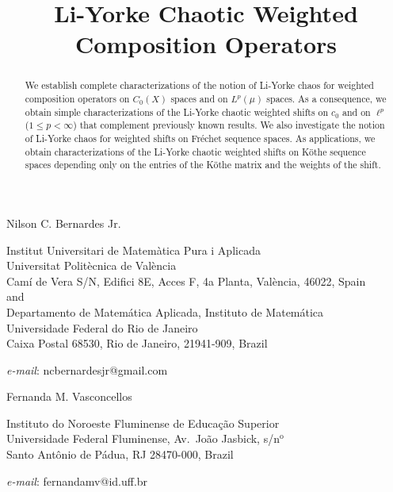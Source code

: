 \documentclass[12pt]{amsart}
\theoremstyle{theorem}
\theoremstyle{definition}
\theoremstyle{remark} \theoremstyle{question} \theoremstyle{example}
\begin{document}

\title[Li-Yorke Chaotic Weighted Composition Operators]{Li-Yorke Chaotic Weighted Composition Operators}

\date{}
\dedicatory{}
\maketitle

\begin{center}
{\sc Nilson C. Bernardes Jr.}

\medskip
Institut Universitari de Matem\`atica Pura i Aplicada\\
Universitat Polit\`ecnica de Val\`encia\\
Cam\'i de Vera S/N, Edifici 8E, Acces F, 4a Planta, Val\`encia, 46022, Spain\\
and\\
Departamento de Matem\'atica Aplicada, Instituto de Matem\'atica\\
Universidade Federal do Rio de Janeiro\\
Caixa Postal 68530, Rio de Janeiro, 21941-909, Brazil

\smallskip
{\it e-mail}: ncbernardesjr@gmail.com

\bigskip
{\sc Fernanda M. Vasconcellos}

\medskip
Instituto do Noroeste Fluminense de Educa\c c\~ao Superior\\
Universidade Federal Fluminense, Av.\ Jo\~ao Jasbick, s/n$^\text{o}$\\
Santo Ant\^onio de P\'adua, RJ 28470-000, Brazil

\smallskip
{\it e-mail}: fernandamv@id.uff.br
\end{center}

\begin{abstract}
We establish complete characterizations of the notion of Li-Yorke chaos for weighted composition operators 
on $C_0(X)$ spaces and on $L^p(\mu)$ spaces. 
As a consequence, we obtain simple characterizations of the Li-Yorke chaotic weighted shifts 
on $c_0$ and on $\ell^p$ ($1 \leq p < \infty$) that complement previously known results. 
We also investigate the notion of Li-Yorke chaos for weighted shifts on Fr\'echet sequence spaces.
As applications, we obtain characterizations of the Li-Yorke chaotic weighted shifts on K\"othe sequence spaces 
depending only on the entries of the K\"othe matrix and the weights of the shift.
\end{abstract}
\end{document}
